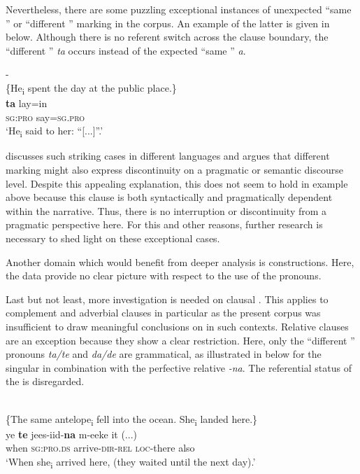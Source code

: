 \documentclass[output=paper
,newtxmath
,modfonts
,nonflat]{langsci/langscibook}
\begin{document}
Nevertheless, there are some puzzling exceptional instances of unexpected “same ” or “different ” marking in the corpus. An example of the latter is given in  below. Although there is no referent switch across the clause boundary, the “different ”  \textit{ta} occurs instead of the expected “same ”  \textit{a}.

\ea\label{ex:apel:23}
{- \citep[284]{Faye1979}}\\
{\-\hspace{0cm}\{He\textsubscript{i} spent the day at the public place.\}}\\
\gll   \textbf{ta} lay=in\\
     \textsc{sg:pro} say\textsc{=sg.pro} \\
\glt ‘He\textsubscript{i} said to her: “[...]”.’
\z

\citet[98-114]{Stirling1993} discusses such striking cases in different languages and argues that different  marking might also express discontinuity on a pragmatic or semantic discourse level. Despite this appealing explanation, this does not seem to hold in example  above because this clause is both syntactically and pragmatically dependent within the narrative. Thus, there is no interruption or discontinuity from a pragmatic perspective here. For this and other reasons, further research is necessary to shed light on these exceptional cases.

Another domain which would benefit from deeper analysis is  constructions. Here, the data provide no clear picture with respect to the use of the  pronouns.

Last but not least, more investigation is needed on clausal . This applies to complement and adverbial clauses in particular as the present corpus was insufficient to draw meaningful conclusions on  in such contexts. Relative clauses are an exception because they show a clear restriction. Here, only the “different ” pronouns \textit{ta/te} and \textit{da/de} are grammatical, as illustrated in  below for the singular in combination with the perfective relative \textit{-na}. The referential status of the  is disregarded.

\ea\label{ex:apel:24}
{  \citep[350]{Renaudier2012}}\\
{\-\hspace{0cm}\{The same antelope\textsubscript{i} fell into the ocean. She\textsubscript{i} landed here.\}} \\
\gll   ye \textbf{te} jees-iid-\textbf{na} m-eeke it (...)\\
     when \textsc{sg:pro.ds} arrive\textsc{-dir-rel} \textsc{loc-}there also \\
\glt ‘When she\textsubscript{i} arrived here, (they waited until the next day).’
\z
\end{document}
